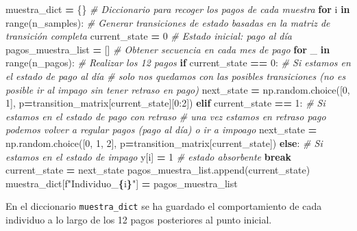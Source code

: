 \documentclass[
  a4paper,
  DIV=11,
  numbers=noendperiod]{scrreprt}
\newenvironment{Shaded}{\begin{snugshade}}{\end{snugshade}}
\newcommand{\BuiltInTok}[1]{#1}
\newcommand{\CommentTok}[1]{\textcolor[rgb]{0.56,0.35,0.01}{\textit{#1}}}
\newcommand{\ControlFlowTok}[1]{\textcolor[rgb]{0.13,0.29,0.53}{\textbf{#1}}}
\newcommand{\DecValTok}[1]{\textcolor[rgb]{0.00,0.00,0.81}{#1}}
\newcommand{\KeywordTok}[1]{\textcolor[rgb]{0.13,0.29,0.53}{\textbf{#1}}}
\newcommand{\NormalTok}[1]{#1}
\newcommand{\OperatorTok}[1]{\textcolor[rgb]{0.81,0.36,0.00}{\textbf{#1}}}
\newcommand{\SpecialCharTok}[1]{\textcolor[rgb]{0.81,0.36,0.00}{\textbf{#1}}}
\newcommand{\SpecialStringTok}[1]{\textcolor[rgb]{0.31,0.60,0.02}{#1}}
\begin{document}
\begin{Shaded}
\begin{Highlighting}[numbers=left,,]
\NormalTok{muestra\_dict }\OperatorTok{=}\NormalTok{ \{\} }\CommentTok{\# Diccionario para recoger los pagos de cada muestra}
\ControlFlowTok{for}\NormalTok{ i }\KeywordTok{in} \BuiltInTok{range}\NormalTok{(n\_samples):}
    \CommentTok{\# Generar transiciones de estado basadas en la matriz de transición completa}
\NormalTok{    current\_state }\OperatorTok{=} \DecValTok{0}  \CommentTok{\# Estado inicial: pago al día}
\NormalTok{    pagos\_muestra\_list }\OperatorTok{=}\NormalTok{ [] }\CommentTok{\# Obtener secuencia en cada mes de pago}
    \ControlFlowTok{for}\NormalTok{ \_ }\KeywordTok{in} \BuiltInTok{range}\NormalTok{(n\_pagos):  }\CommentTok{\# Realizar los 12 pagos}
        \ControlFlowTok{if}\NormalTok{ current\_state }\OperatorTok{==} \DecValTok{0}\NormalTok{:  }\CommentTok{\# Si estamos en el estado de pago al día}
            \CommentTok{\# solo nos quedamos con las posibles transiciones (no es posible ir al impago sin tener retraso en pago)}
\NormalTok{            next\_state }\OperatorTok{=}\NormalTok{ np.random.choice([}\DecValTok{0}\NormalTok{, }\DecValTok{1}\NormalTok{], p}\OperatorTok{=}\NormalTok{transition\_matrix[current\_state][}\DecValTok{0}\NormalTok{:}\DecValTok{2}\NormalTok{])}
        \ControlFlowTok{elif}\NormalTok{ current\_state }\OperatorTok{==} \DecValTok{1}\NormalTok{:  }\CommentTok{\# Si estamos en el estado de pago con retraso}
            \CommentTok{\# una vez estamos en retraso pago podemos volver a regular pagos (pago al día) o ir a impoago}
\NormalTok{            next\_state }\OperatorTok{=}\NormalTok{ np.random.choice([}\DecValTok{0}\NormalTok{, }\DecValTok{1}\NormalTok{, }\DecValTok{2}\NormalTok{], p}\OperatorTok{=}\NormalTok{transition\_matrix[current\_state])}
        \ControlFlowTok{else}\NormalTok{:  }\CommentTok{\# Si estamos en el estado de impago}
\NormalTok{            y[i] }\OperatorTok{=} \DecValTok{1}  \CommentTok{\# estado absorbente}
            \ControlFlowTok{break}
\NormalTok{        current\_state }\OperatorTok{=}\NormalTok{ next\_state}
\NormalTok{        pagos\_muestra\_list.append(current\_state)}
\NormalTok{        muestra\_dict[}\SpecialStringTok{f"Individuo\_}\SpecialCharTok{\{}\NormalTok{i}\SpecialCharTok{\}}\SpecialStringTok{"}\NormalTok{] }\OperatorTok{=}\NormalTok{ pagos\_muestra\_list}
\end{Highlighting}
\end{Shaded}

En el diccionario \texttt{muestra\_dict} se ha guardado el
comportamiento de cada individuo a lo largo de los 12 pagos posteriores
al punto inicial.
\end{document}
